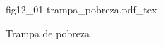 \begin{figure}[h]
\centering
\def\svgwidth{0.5\textwidth}
{fig12_01-trampa_pobreza.pdf_tex}
\caption{Trampa de pobreza}
\label{fig12_01-trampa_pobreza}
\end{figure}